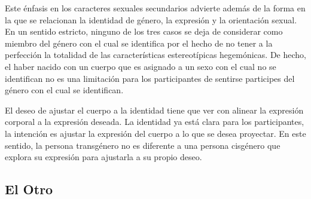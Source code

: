 Este énfasis en los caracteres sexuales secundarios advierte además de la forma
en la que se relacionan la identidad de género, la expresión y la orientación
sexual. En un sentido estricto, ninguno de los tres casos se deja de considerar
como miembro del género con el cual se identifica por el hecho de no tener a la
perfección la totalidad de las características estereotípicas hegemónicas. De
hecho, el haber nacido con un cuerpo que es asignado a un sexo con el cual no se
identifican no es una limitación para los participantes de sentirse participes
del género con el cual se identifican.

El deseo de ajustar el cuerpo a la identidad tiene que ver con alinear la
expresión corporal a la expresión deseada. La identidad ya está clara para los
participantes, la intención es ajustar la expresión del cuerpo a lo que se desea
proyectar. En este sentido, la persona transgénero no es diferente a una persona
cisgénero que explora su expresión para ajustarla a su propio deseo.

\subsection{El Otro}
%
%
